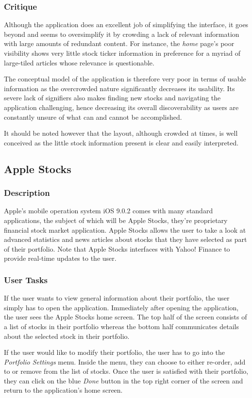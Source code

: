 \documentclass{sigchi}
\begin{document}
\subsubsection{Critique}
Although the application does an excellent job of simplifying the interface, it goes beyond and seems to oversimplify it by crowding a lack of relevant information with large amounts of redundant content. For instance, the \textit{home} page's poor visibility shows very little stock ticker information in preference for a myriad of large-tiled articles whose relevance is questionable. \par
The conceptual model of the application is therefore very poor in terms of usable information as the overcrowded nature significantly decreases its usability. Its severe lack of signifiers also makes finding new stocks and navigating the application challenging, hence decreasing its overall discoverability as users are constantly unsure of what can and cannot be accomplished. \par
It should be noted however that the layout, although crowded at times, is well conceived as the little stock information present is clear and easily interpreted.



\subsection{Apple Stocks}
\subsubsection{Description}
Apple's mobile operation system iOS 9.0.2 comes with many standard applications, the subject of which will be Apple Stocks, they're proprietary financial stock market application. Apple Stocks allows the user to take a look at advanced statistics and news articles about stocks that they have selected as part of their portfolio. Note that Apple Stocks interfaces with Yahoo! Finance to provide real-time updates to the user.

\subsubsection{User Tasks}
If the user wants to view general information about their portfolio, the user simply has to open the application. Immediately after opening the application, the user sees the Apple Stocks home screen. The top half of the screen consists of a list of stocks in their portfolio whereas the bottom half communicates details about the selected stock in their portfolio. \par
If the user would like to modify their portfolio, the user has to go into the \textit{Portfolio Settings} menu. Inside the menu, they can choose to either re-order, add to or remove from the list of stocks. Once the user is satisfied with their portfolio, they can click on the blue \textit{Done} button in the top right corner of the screen and return to the application's home screen.
\end{document}
